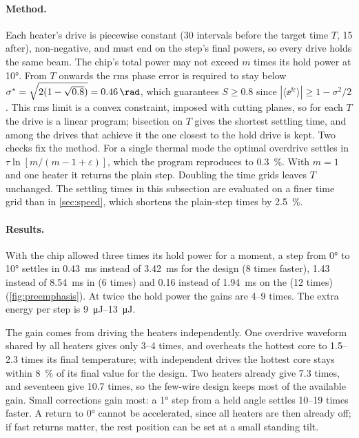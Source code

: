 \paragraph{Method.} Each heater's drive is piecewise constant (30 intervals before the target time $T$, 15 after),
non-negative, and must end on the step's final powers, so every drive holds the same beam. The chip's total power
may not exceed $m$ times its hold power at \ang{10}. From $T$ onwards the rms phase error is required to stay below
$\sigma^*=\sqrt{2(1-\sqrt{0.8})}=\qty{0.46}{\rad}$, which guarantees $S\ge0.8$ since
$|\langle\ee^{\ii\varepsilon}\rangle|\ge1-\sigma^2/2$. This rms limit is a convex constraint, imposed with cutting
planes, so for each $T$ the drive is a linear program; bisection on $T$ gives the shortest settling time, and among
the drives that achieve it the one closest to the hold drive is kept. Two checks fix the method. For a single
thermal mode the optimal overdrive settles in $\tau\ln[m/(m-1+\varepsilon)]$, which the program reproduces to
\qty{0.3}{\percent}. With $m=1$ and one heater it returns the plain step. Doubling the time grids leaves $T$
unchanged. The settling times in this subsection are evaluated on a finer time grid than in \cref{sec:speed}, which
shortens the plain-step times by \qty{2.5}{\percent}.

\paragraph{Results.} With the chip allowed three times its hold power for a moment, a step from \ang{0} to \ang{10}
settles in \qty{0.43}{\milli\second} instead of \qty{3.42}{\milli\second} for the  design (\num{8} times
faster), \qty{1.43}{} instead of \qty{8.54}{\milli\second} in  (\num{6} times) and \qty{0.16}{} instead of
\qty{1.94}{\milli\second} on the  (\num{12} times) (\cref{fig:preemphasis}). At twice the hold power the
gains are \numrange{4}{9} times. The extra energy per step is \qtyrange{9}{13}{\micro\joule}.

The gain comes from driving the heaters independently. One overdrive waveform shared by all heaters gives only
\numrange{3}{4} times, and overheats the hottest core to \numrange{1.5}{2.3} times its final temperature; with
independent drives the hottest core stays within \qty{8}{\percent} of its final value for the  design.
Two heaters already give \num{7.3} times, and seventeen give \num{10.7} times, so the few-wire design keeps most of
the available gain. Small corrections gain most: a \ang{1} step from a held angle settles \numrange{10}{19} times
faster. A return to \ang{0} cannot be accelerated, since all heaters are then already off; if fast returns matter,
the rest position can be set at a small standing tilt.

